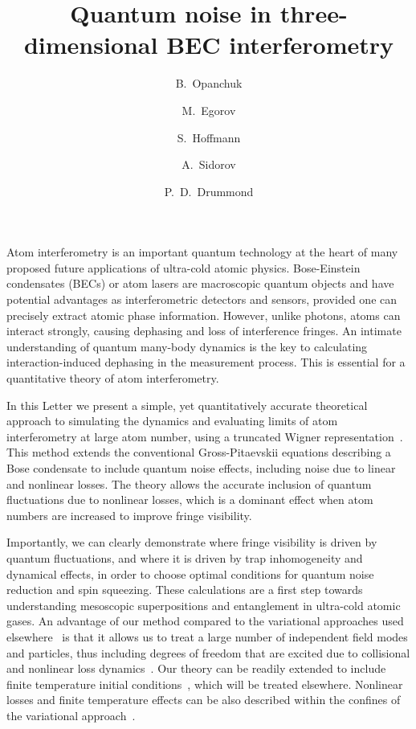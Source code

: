\documentclass[doublecol]{epl2}
\title{Quantum noise in three-dimensional BEC interferometry}
\author{B.~Opanchuk\inst{1} \and M.~Egorov\inst{1} \and S.~Hoffmann\inst{2} \and A.~Sidorov\inst{1} \and P.~D.~Drummond\inst{1}}
\institute{
  \inst{1} Centre for Atom Optics and Ultrafast Spectroscopy, Swinburne University of Technology, Hawthorn, VIC 3122, Australia \\
  \inst{2} Physics Department, University of Queensland, Queensland, Australia
}
\begin{document}
\maketitle

Atom interferometry is an important quantum technology
at the heart of many proposed future applications of ultra-cold atomic physics.
Bose-Einstein condensates (BECs) or atom lasers are macroscopic quantum objects and have potential advantages as interferometric detectors and sensors,
provided one can precisely extract atomic phase information.
However, unlike photons, atoms can interact strongly, causing dephasing and loss of interference fringes.
An intimate understanding of quantum many-body dynamics is the key to calculating
interaction-induced dephasing in the measurement process.
This is essential for a quantitative theory of atom interferometry.

In this Letter we present a simple, yet quantitatively accurate theoretical approach
to simulating the dynamics and evaluating limits of atom interferometry at large atom number,
using a truncated Wigner representation~\cite{Drummond1993,Steel1998,Sinatra2002}.
This method extends the conventional Gross-Pitaevskii equations
describing a Bose condensate to include quantum noise effects,
including noise due to linear and nonlinear losses.
The theory allows the accurate inclusion of quantum fluctuations due to nonlinear losses,
which is a dominant effect when atom numbers are increased to improve fringe visibility.

Importantly, we can clearly demonstrate where fringe visibility is driven by quantum fluctuations,
and where it is driven by trap inhomogeneity and dynamical effects,
in order to choose optimal conditions for quantum noise reduction and spin squeezing.
These calculations are a first step towards understanding mesoscopic superpositions and entanglement in ultra-cold atomic gases.
An advantage of our method compared to the variational approaches used elsewhere~\cite{Li2009,Sakmann2009}
is that it allows us to treat a large number of independent field modes and particles,
thus including degrees of freedom that are excited due to
collisional and nonlinear loss dynamics~\cite{Norrie2005,Deuar2007}.
Our theory can be readily extended to include finite temperature initial conditions~\cite{Steel1998,Isella2006},
which will be treated elsewhere.
Nonlinear losses and finite temperature effects can be also described within the confines of the variational approach~\cite{Li2008,Sinatra2011}.
\end{document}
